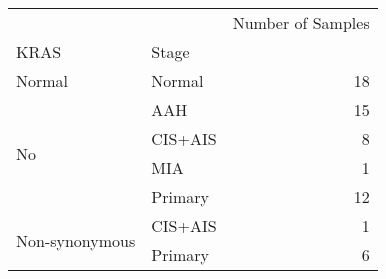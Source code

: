 \begin{tabular}{l|lr}
\toprule
               &         & Number of Samples \\
KRAS & Stage &                   \\
\midrule
Normal & Normal &                18 \\
\multirow{4}{*}{No} & AAH &                15 \\
               & CIS+AIS &                 8 \\
               & MIA &                 1 \\
               & Primary &                12 \\
\cline{1-3}
\multirow{2}{*}{Non-synonymous} & CIS+AIS &                 1 \\
               & Primary &                 6 \\
\bottomrule
\end{tabular}
